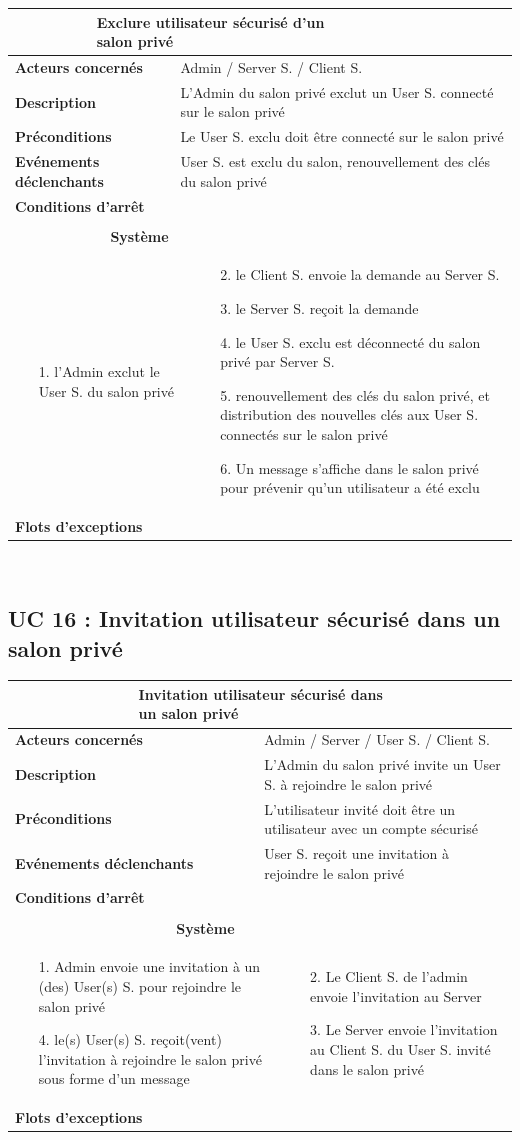 \documentclass[a4paper,11pt,french]{article}
\newcommand{\fiche}[9] {
	\noindent
\begin{tabular}{|p{3.5cm}| p{1cm} | p{3cm} | p{.5cm} | p{7cm}|} 
\hline
\rowcolor{blue}
\multicolumn{2}{|l|}{\color{white}\bfseries{Nom}} & \multicolumn{3}{l|}{\color{white}\bfseries{#1}}\\
\hline
\multicolumn{2}{|l|}{\bfseries{Acteurs concernés}} & \multicolumn{3}{m{10.5cm}|}{#2}\\
\hline
\multicolumn{2}{|l|}{\bfseries{Description}} & \multicolumn{3}{m{10.5cm}|}{#3}\\
\hline
\multicolumn{2}{|l|}{\bfseries{Préconditions}} & \multicolumn{3}{m{10.5cm}|}{#4}\\
\hline
\multicolumn{2}{|l|}{\bfseries{Evénements déclenchants}} & \multicolumn{3}{m{10.5cm}|}{#5}\\
\hline
\multicolumn{2}{|l|}{\bfseries{Conditions d'arrêt}} & \multicolumn{3}{m{10.5cm}|}{#6}\\
\hline
\rowcolor{gray}
\multicolumn{5}{|c|}{\bfseries{Description du flot d'événements principal}}\\
\hline
\rowcolor{gray}
\multicolumn{3}{|c|}{\bfseries{Acteur(s)}} & \multicolumn{2}{c|}{\bfseries{Système}}\\
\hline
\multicolumn{3}{|p{7.5cm}|}{#7} & \multicolumn{2}{p{7.5cm}|}{#8}\\
\hline
\multicolumn{2}{|l}{\bfseries{Flots d'exceptions}} & \multicolumn{3}{|p{11.5cm}|}{#9}\\
\hline
\end{tabular}
\\
}
\begin{document}
\fiche
	{Exclure utilisateur sécurisé d’un salon privé} %
	{Admin / Server S. / Client S.} %
	{L’Admin du salon privé exclut un User S. connecté sur le salon privé} %
	{Le User S. exclu doit être connecté sur le salon privé} %
	{User S. est exclu du salon, renouvellement des clés du salon privé} %
	{} %
	{\begin{itemize}  %
		\item [1.] l’Admin exclut le User S. du salon privé
	 \end{itemize}
	} 
	{\begin{itemize}  %
		\item []
		\item [2.] le Client S. envoie la demande au Server S.
		\item [3.] le Server S. reçoit la demande
		\item [4.] le User S. exclu est déconnecté du salon privé par Server S.
		\item [5.] renouvellement des clés du salon privé, et distribution des nouvelles clés aux User S. connectés sur le salon privé
		\item [6.] Un message s’affiche dans le salon privé pour prévenir qu’un utilisateur a été exclu
	 \end{itemize}
	 }
	{} %

\subsection{UC 16 : Invitation utilisateur sécurisé dans un salon privé}

\fiche
	{Invitation utilisateur sécurisé dans un salon privé} %
	{Admin / Server / User S. / Client S.} %
	{L’Admin du salon privé invite un User S. à rejoindre le salon privé} %
	{L’utilisateur invité doit être un utilisateur avec un compte  sécurisé} %
	{User S. reçoit une invitation à rejoindre le salon privé} %
	{} %
	{\begin{itemize}  %
		\item [1.] Admin envoie une invitation à un (des) User(s) S. pour rejoindre le salon privé
		\item []
		\item []
		\item [4.] le(s) User(s) S. reçoit(vent) l’invitation à rejoindre le salon privé sous forme d’un message
	 \end{itemize}
	} 
	{\begin{itemize}  %
		\item []
		\item [2.] Le Client S. de l’admin envoie l’invitation au Server
		\item [3.] Le Server envoie l’invitation au Client S. du User S. invité dans le salon privé
	 \end{itemize}
	 }
	{} %
	
\end{document}
